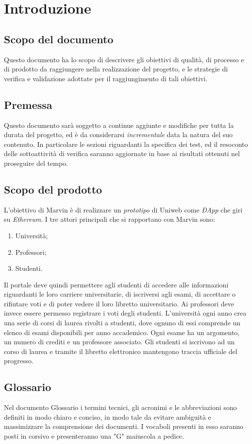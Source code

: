 \section{Introduzione}
\subsection{Scopo del documento}
Questo documento ha lo scopo di descrivere gli obiettivi di qualità, di processo e di prodotto da raggiungere nella realizzazione del progetto, e le strategie di verifica e validazione adottate per il raggiungimento di tali obiettivi.
\subsection{Premessa}
Questo documento sarà soggetto a continue aggiunte e modifiche per tutta la durata del progetto, ed è da considerarsi \textit{incrementale} data la natura del suo contenuto. In particolare le sezioni riguardanti la specifica dei test, ed il resoconto delle sottoattività di verifica saranno aggiornate in base ai risultati ottenuti nel proseguire del tempo.
\subsection{Scopo del prodotto}
L'obiettivo di Marvin è di realizzare un \textit{prototipo} di Uniweb come \textit{ÐApp} che giri su \textit{Ethereum}. I tre attori principali che si rapportano con Marvin sono:
\begin{enumerate}
	\item Università;
	\item Professori;
	\item Studenti.
\end{enumerate}
Il portale deve quindi permettere agli studenti di accedere alle informazioni riguardanti le loro carriere universitarie, di iscriversi agli esami, di accettare o rifiutare voti e di poter vedere il loro libretto universitario.
Ai professori deve invece essere permesso registrare i voti degli studenti.
L'università ogni anno crea una serie di corsi di laurea rivolti a studenti, dove ognuno di essi comprende un elenco di esami disponibili per anno accademico. Ogni esame ha un argomento, un numero di crediti e un professore associato. Gli studenti si iscrivono ad un corso di laurea e tramite il libretto elettronico mantengono traccia ufficiale del progresso.
\subsection{Glossario}
Nel documento Glossario i termini tecnici, gli acronimi e le abbreviazioni sono definiti in modo chiaro e conciso, in modo tale da evitare ambiguità e massimizzare la comprensione dei documenti.
\newline I vocaboli presenti in esso saranno posti in corsivo e presenteranno una "G" maiuscola a pedice.
